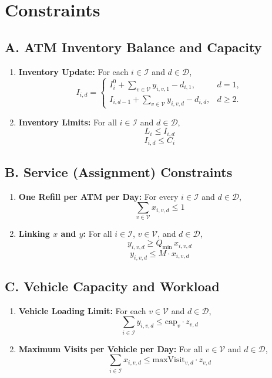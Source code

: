 \documentclass[11pt]{article}
\begin{document}
\section*{Constraints}
\subsection*{A. ATM Inventory Balance and Capacity}
\begin{enumerate}[label=\textbf{(A\arabic*)}]
    \item \textbf{Inventory Update:} For each \(i \in \mathcal{I}\) and \(d \in \mathcal{D}\),
    \[
    I_{i,d} =
    \begin{cases}
    I_i^0 + \displaystyle\sum_{v \in \mathcal{V}} y_{i,v,1} - d_{i,1}, & d=1,\\[1mm]
    I_{i,d-1} + \displaystyle\sum_{v \in \mathcal{V}} y_{i,v,d} - d_{i,d}, & d \ge 2.
    \end{cases}
    \]
    \item \textbf{Inventory Limits:} For all \(i \in \mathcal{I}\) and \(d \in \mathcal{D}\),
    \[
        L_i \le I_{i,d}
    \]
    \[
        I_{i,d} \le C_i
    \]
\end{enumerate}

\subsection*{B. Service (Assignment) Constraints}
\begin{enumerate}[label=\textbf{(B\arabic*)}]
    \item \textbf{One Refill per ATM per Day:} For every \(i \in \mathcal{I}\) and \(d \in \mathcal{D}\),
    \[
    \sum_{v \in \mathcal{V}} x_{i,v,d} \le 1
    \]
    \item \textbf{Linking \(x\) and \(y\):} For all \(i \in \mathcal{I}\), \(v \in \mathcal{V}\), and \(d \in \mathcal{D}\),
    \[
        y_{i,v,d} \ge Q_{\min} \, x_{i,v,d}
    \]
    \[
        y_{i,v,d} \le M\cdot x_{i,v,d}
    \]
\end{enumerate}

\subsection*{C. Vehicle Capacity and Workload}
\begin{enumerate}[label=\textbf{(C\arabic*)}]
    \item \textbf{Vehicle Loading Limit:} For each \(v \in \mathcal{V}\) and \(d \in \mathcal{D}\),
    \[
    \sum_{i \in \mathcal{I}} y_{i,v,d} \le \text{cap}_v \cdot z_{v,d}
    \]
    \item \textbf{Maximum Visits per Vehicle per Day:} For all \(v \in \mathcal{V}\) and \(d \in \mathcal{D}\),
    \[
    \sum_{i \in \mathcal{I}} x_{i,v,d} \le \text{maxVisit}_{v,d} \cdot z_{v,d}
    \]
\end{enumerate}
\end{document}
